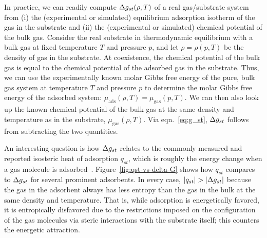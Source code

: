 

In practice, we can readily compute $\Delta g_{st}(\rho, T)$ of a real gas/substrate system from (i) the (experimental or simulated) equilibrium adsorption isotherm of the gas in the substrate and (ii) the (experimental or simulated) chemical potential of the bulk gas. 
Consider the real substrate in thermodynamic equilibrium with a bulk gas at fixed temperature $T$ and pressure $p$, and let $\rho=\rho(p, T)$ be the density of gas in the substrate. 
At coexistence, the chemical potential of the bulk gas is equal to the chemical potential of the adsorbed gas in the substrate. Thus, we can use the experimentally known molar Gibbs free energy of the pure, bulk gas system at temperature $T$ and pressure $p$ to determine the molar Gibbs free energy of the adsorbed system: $\mu_{\text{ads}}(\rho, T)=\mu_{\text{gas}}(p, T)$. We can then also look up the known chemical potential of the bulk gas at the same density and temperature as in the substrate, $\mu_{\text{gas}}(\rho, T)$. Via eqn.~\ref{eq:g_st}, $\Delta g_{st}$ follows from subtracting the two quantities.

An interesting question is how $\Delta g_{st}$ relates to the commonly measured and reported isosteric heat of adsorption $q_{st}$, which is roughly the energy change when a gas molecule is adsorbed~\cite{sircar1999isosteric, tian2017differential}. Figure~\ref{fig:qst-vs-delta-G} shows how $q_{st}$ compares to $\Delta g_{st}$ for several prominent adsorbents. In every case, $|q_{st}|>|\gst|$ because the gas in the adsorbent always has less entropy than the gas in the bulk at the same density and temperature. That is, while adsorption is energetically favored, it is entropically disfavored due to the restrictions imposed on the configuration of the gas molecules via steric interactions with the substrate itself; this counters the energetic attraction. 

